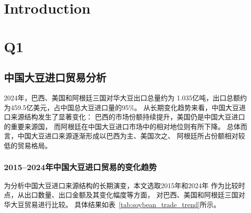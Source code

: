 \documentclass{apmcmthesis}
\begin{document}
\pagestyle{frontmatterstyle}

\begin{abstract} 
    
This is abstract of this thesis

\end{abstract}



\newpage
\tableofcontents


\newpage
\pagestyle{mainmatterstyle}
\setcounter{page}{1}

\section{Introduction}




\section{Q1}


\subsection{中国大豆进口贸易分析}
\label{subsec:soybean_trade_analysis}

2024年，巴西、美国和阿根廷三国对华大豆出口总量约为
1.035亿吨，出口总额约为459.5亿美元，占中国总大豆进口量的95\%。
从长期变化趋势来看，中国大豆进口来源结构发生了显著变化：
巴西的市场份额持续提升，美国仍是中国大豆进口的重要来源国，
而阿根廷在中国大豆进口市场中的相对地位则有所下降。
总体而言，中国大豆进口来源逐渐形成以巴西为主、美国次之、
阿根廷所占份额相对较低的贸易格局。

\subsubsection{2015--2024年中国大豆进口贸易的变化趋势}

为分析中国大豆进口来源结构的长期演变，本文选取2015年和2024年
作为比较时点，从出口数量、出口金额及其变化幅度等方面，
对巴西、美国和阿根廷三国对华大豆贸易进行比较。
具体结果如表~\ref{tab:soybean_trade_trend}所示。
\end{document}
